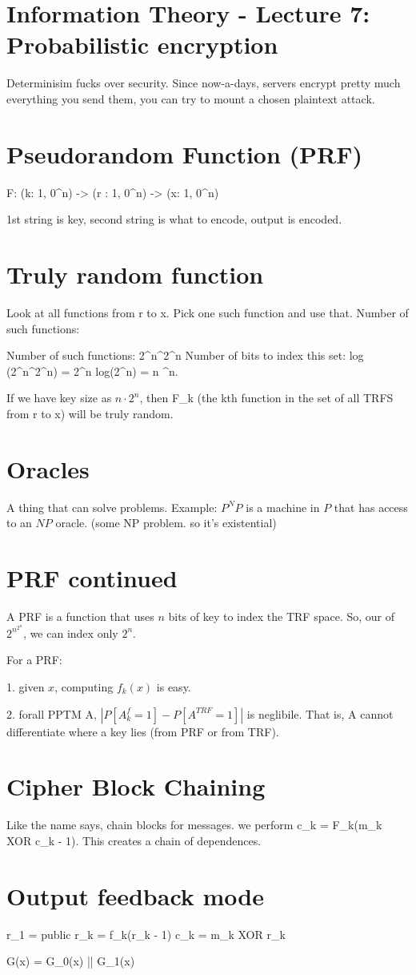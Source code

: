 \section{Information Theory - Lecture 7: Probabilistic encryption}

Determinisim fucks over security. Since now-a-days, servers encrypt pretty much everything you send them,
you can try to mount a chosen plaintext attack.

\section{Pseudorandom Function (PRF)}

F: (k: {1, 0}^n) -> (r : {1, 0}^n) -> (x: {1, 0}^n)

1st string is key, second string is what to encode, output is encoded.

\section{Truly random function}
Look at all functions from r to x. Pick one such function and use that. Number of such functions:

Number of such functions: 2^n^{2^n}
Number of bits to index this set: log (2^n^{2^n}) = 2^n log(2^n) = n ^n.


If we have key size as $n \cdot 2^n$, then F_k (the kth function in the set of all TRFS from r to x) will be truly random.


\section{Oracles}

A thing that can solve problems. Example: $P^NP$ is a machine in $P$ that has access to an $NP $ oracle. (some NP problem. so it's existential)


\section{PRF continued}
A PRF is a function that uses $n$ bits of key to index the TRF space. So, our of $2^n^{2^n}$, we can index only $2^n$.

For a PRF:

1. given $x$, computing $f_k(x)$ is easy.

2. forall PPTM A, $|P[A^f_k = 1] - P[A^{TRF} = 1]|$ is neglibile. That is, A cannot differentiate where a key lies (from PRF or from TRF).

\section{Cipher Block Chaining}

Like the name says, chain blocks for messages. we perform c_k = F_k(m_k XOR c_{k - 1}). This creates a chain of dependences.

\section{Output feedback mode}
r_1 = public
r_k = f_k(r_{k - 1})
c_k = m_k XOR r_k


G(x) = G_0(x) || G_1(x)







